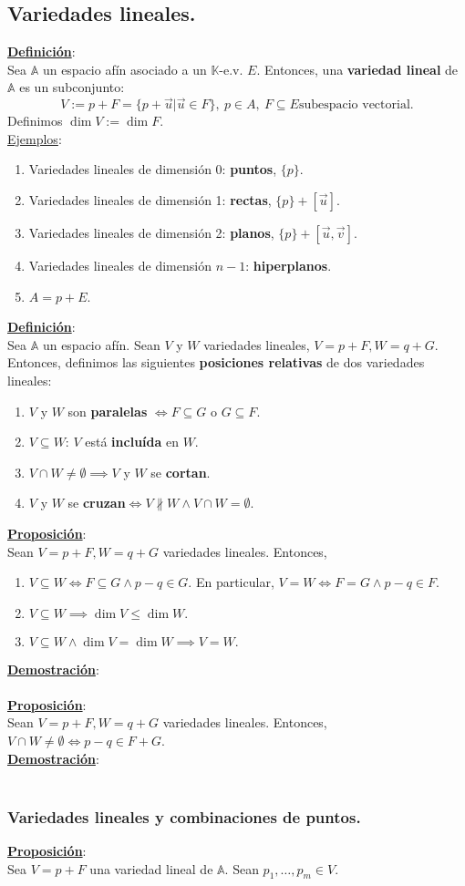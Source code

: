 \documentclass[11pt]{article}
\newcommand{\kev}{$\mathbb{K}$-e.v. }
\newcommand{\af}{\mathbb{A}}
\newcommand{\defi}{\underline{\textbf{Definición}}:\\}
\newcommand{\prop}{\underline{\textbf{Proposición}}:\\}
\newcommand{\dem}{\underline{\textbf{Demostración}}:\\}
\newcommand{\ej}{\underline{Ejemplos}:\\}
\begin{document}
\subsection{Variedades lineales.}
\defi Sea $\af$ un espacio afín asociado a un \kev $E$. Entonces, una \textbf{variedad lineal} de $\af$ es un subconjunto:
$$
V:=p+F=\{p+\vec{u}\vert\vec{u}\in F\},\ p\in A,\ F\subseteq E\textrm{subespacio vectorial.}
$$
Definimos $\dim V:=\dim F$.\\
\ej
\begin{enumerate}
	\item Variedades lineales de dimensión 0: \textbf{puntos}, $\{p\}$.
	\item Variedades lineales de dimensión 1: \textbf{rectas}, $\{p\}+[\vec{u}]$.
	\item Variedades lineales de dimensión 2: \textbf{planos}, $\{p\}+[\vec{u},\vec{v}]$.
	\item Variedades lineales de dimensión $n-1$: \textbf{hiperplanos}.
	\item $A=p+E$.
\end{enumerate}
\defi Sea $\af$ un espacio afín. Sean $V$ y $W$ variedades lineales, $V=p+F,W=q+G$. Entonces, definimos las siguientes \textbf{posiciones relativas} de dos variedades lineales:
\begin{enumerate}
	\item $V$ y $W$ son \textbf{paralelas} $\iff F\subseteq G$ o $G\subseteq F$.
	\item $V\subseteq W$: $V$ está \textbf{incluída} en $W$.
	\item $V\cap W\neq\emptyset\implies V$ y $W$ se \textbf{cortan}.
	\item $V$ y $W$ se \textbf{cruzan}$\iff V\nparallel W\wedge V\cap W=\emptyset$.
\end{enumerate}
\prop Sean $V=p+F,W=q+G$ variedades lineales. Entonces,
\begin{enumerate}
	\item $V\subseteq W\iff F\subseteq G\wedge p-q\in G$. En particular, $V=W\iff F=G\wedge p-q\in F$.
	\item $V\subseteq W\implies\dim V\leq\dim W.$
	\item $V\subseteq W\wedge\dim V=\dim W\implies V=W.$
\end{enumerate}
\dem \\
\prop Sean $V=p+F,W=q+G$ variedades lineales. Entonces, $V\cap W\neq\emptyset\iff p-q\in F+G$.\\
\dem \\
\subsubsection{Variedades lineales y combinaciones de puntos.}
\prop Sea $V=p+F$ una variedad lineal de $\af$. Sean $p_1,\ldots,p_m\in V$.
\newpage

\newpage
\end{document}
